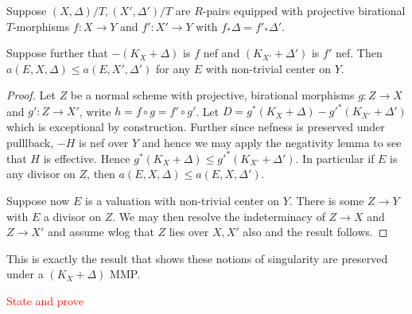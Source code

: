 \documentclass[a4paper,12pt]{book}
\newcommand\myworries[1]{\textcolor{red}{#1}}
\begin{document}
\begin{lemma}
	Suppose $(X,\Delta)/T,(X',\Delta')/T$ are $R$-pairs equipped with projective birational $T$-morphisms $f:X \to Y$ and $f':X'\to Y$ with $f_{*}\Delta=f'_{*}\Delta'$.
	
	Suppose further that $-(K_{X}+\Delta)$ is $f$ nef and $(K_{X'}+\Delta')$ is $f'$ nef. Then $a(E,X,\Delta) \leq a(E,X',\Delta')$ for any $E$ with non-trivial center on $Y$.
\end{lemma}
\begin{proof}
	Let $Z$ be a normal scheme with projective, birational morphisms $g:Z \to X$ and $g':Z \to X'$, write $h=f \circ g=f' \circ g'$. Let $D= g^{*}(K_{X}+\Delta)-g'^{*}(K_{X'}+\Delta')$ which is exceptional by construction. Further since nefness is preserved under pulllback, $-H$ is nef over $Y$ and hence we may apply the negativity lemma to see that $H$ is effective. Hence $g^{*}(K_{X}+\Delta) \leq g'^{*}(K_{X'}+\Delta')$. In particular if $E$ is any divisor on $Z$, then $a(E,X,\Delta) \leq a(E,X,\Delta')$.
	
	Suppose now $E$ is a valuation with non-trivial center on $Y$. There is some $Z \to Y$ with $E$ a divisor on $Z$. We may then resolve the indeterminacy of $Z \to X$ and $Z \to X'$ and assume wlog that $Z$ lies over $X,X'$ also and the result follows.
\end{proof}

This is exactly the result that shows these notions of singularity are preserved under a $(K_{X}+\Delta)$ MMP.

\myworries{State and prove}

%	
\end{document}
